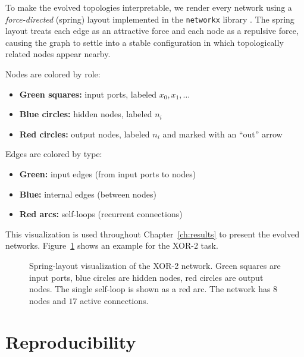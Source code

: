 To make the evolved topologies interpretable, we render every network
using a \emph{force-directed} (spring) layout implemented in the
\texttt{networkx} library \citep{hagberg2008exploring}. The spring
layout treats each edge as an attractive force and each node as a
repulsive force, causing the graph to settle into a stable
configuration in which topologically related nodes appear nearby.

Nodes are colored by role:

\begin{itemize}
  \item \textbf{Green squares:} input ports, labeled $x_0, x_1, \ldots$
  \item \textbf{Blue circles:} hidden nodes, labeled $n_i$
  \item \textbf{Red circles:} output nodes, labeled $n_i$ and marked
    with an ``out'' arrow
\end{itemize}

Edges are colored by type:

\begin{itemize}
  \item \textbf{Green:} input edges (from input ports to nodes)
  \item \textbf{Blue:} internal edges (between nodes)
  \item \textbf{Red arcs:} self-loops (recurrent connections)
\end{itemize}

This visualization is used throughout Chapter~\ref{ch:results} to
present the evolved networks. Figure~\ref{fig:viz-example} shows an
example for the XOR-2 task.

\begin{figure}[h]
  \centering
  \caption{Spring-layout visualization of the XOR-2 network. Green
    squares are input ports, blue circles are hidden nodes, red circles
    are output nodes. The single self-loop is shown as a red arc. The
    network has $8$ nodes and $17$ active connections.}
  \label{fig:viz-example}
\end{figure}

\section{Reproducibility}
\label{sec:exp-repro}

